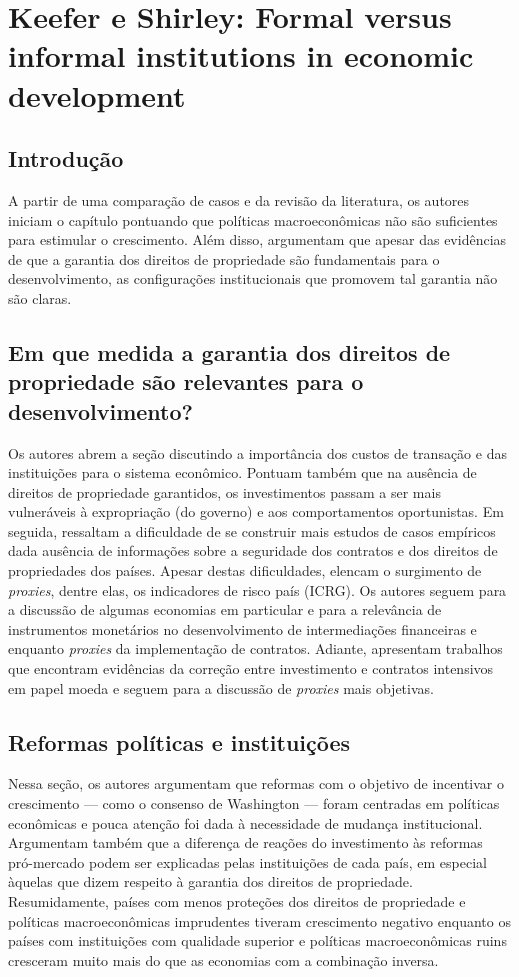 \section*{Keefer e Shirley: Formal versus informal institutions in economic development}

\subsection*{Introdução}

A partir de uma comparação de casos e da revisão da literatura, os autores iniciam o capítulo pontuando que políticas macroeconômicas não são suficientes para estimular o crescimento. Além disso, argumentam que apesar das evidências de que a garantia dos direitos de propriedade são fundamentais para o desenvolvimento, as configurações institucionais que promovem tal garantia não são claras.

\subsection*{Em que medida a garantia dos direitos de propriedade são relevantes para o desenvolvimento?}

Os autores abrem a seção discutindo a importância dos custos de transação e das instituições para o sistema econômico. Pontuam também que na ausência de direitos de propriedade garantidos, os investimentos passam a ser mais vulneráveis à expropriação (do governo) e aos comportamentos oportunistas. Em seguida, ressaltam a dificuldade de se construir mais estudos de casos empíricos dada ausência de informações sobre a seguridade dos contratos e dos direitos de propriedades dos países. Apesar destas dificuldades, elencam o surgimento de \textit{proxies}, dentre elas, os indicadores de risco país (ICRG). Os autores seguem para a discussão de algumas economias em particular e para a relevância de instrumentos monetários no desenvolvimento de intermediações financeiras e enquanto \textit{proxies} da implementação de contratos. Adiante, apresentam trabalhos que encontram evidências da correção entre investimento e contratos intensivos em papel moeda e seguem para a discussão de \textit{proxies} mais objetivas.

\subsection*{Reformas políticas e instituições}

Nessa seção, os autores argumentam que reformas com o objetivo de incentivar o crescimento --- como o consenso de Washington ---  foram centradas em políticas econômicas e pouca atenção foi dada à necessidade de mudança institucional. Argumentam também que a diferença de reações do investimento às reformas pró-mercado podem ser explicadas pelas instituições de cada país, em especial àquelas que dizem respeito à garantia dos direitos de propriedade. Resumidamente, países com menos proteções dos direitos de propriedade e políticas macroeconômicas imprudentes tiveram crescimento negativo enquanto  os países com instituições com qualidade superior e políticas macroeconômicas ruins cresceram muito mais do que as economias com a combinação inversa.

